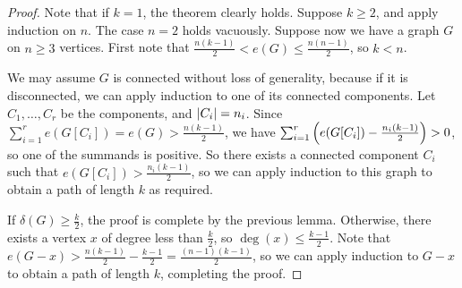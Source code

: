 \begin{proof}
	Note that if \( k = 1 \), the theorem clearly holds.
	Suppose \( k \geq 2 \), and apply induction on \( n \).
	The case \( n = 2 \) holds vacuously.
	Suppose now we have a graph \( G \) on \( n \geq 3 \) vertices.
	First note that \( \frac{n(k-1)}{2} < e(G) \leq \frac{n(n-1)}{2} \), so \( k < n \).

	We may assume \( G \) is connected without loss of generality, because if it is disconnected, we can apply induction to one of its connected components.
	Let \( C_1, \dots, C_r \) be the components, and \( \abs{C_i} = n_i \).
	Since \( \sum_{i=1}^r e(G[C_i]) = e(G) > \frac{n(k-1)}{2} \), we have \( \sum_{i=1}^r \qty(e(G[C_i]) - \frac{n_i(k - 1)}{2}) > 0 \), so one of the summands is positive.
	So there exists a connected component \( C_i \) such that \( e(G[C_i]) > \frac{n_i(k-1)}{2} \), so we can apply induction to this graph to obtain a path of length \( k \) as required.

	If \( \delta(G) \geq \frac{k}{2} \), the proof is complete by the previous lemma.
	Otherwise, there exists a vertex \( x \) of degree less than \( \frac{k}{2} \), so \( \deg(x) \leq \frac{k-1}{2} \).
	Note that \( e(G - x) > \frac{n(k-1)}{2} - \frac{k-1}{2} = \frac{(n-1)(k-1)}{2} \), so we can apply induction to \( G - x \) to obtain a path of length \( k \), completing the proof.
\end{proof}

